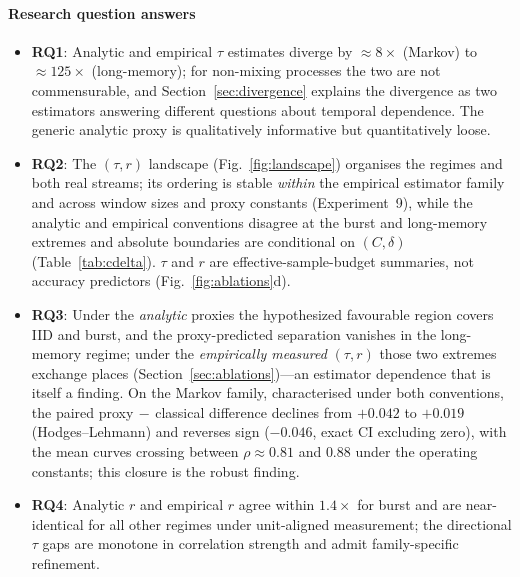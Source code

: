 \documentclass[sensors,article,submit,pdftex,moreauthors]{Definitions/mdpi}
\providecommand{\DIFadd}[1]{{\protect\color{blue}#1}} %
\providecommand{\DIFdel}[1]{} %
\providecommand{\DIFaddbegin}{} %
\providecommand{\DIFaddend}{} %
\providecommand{\DIFdelbegin}{} %
\providecommand{\DIFdelend}{} %
\begin{document}
\paragraph{Research question answers}
\begin{itemize}
    \item \textbf{RQ1}: Analytic \DIFdelbegin \DIFdel{proxies overestimate }\DIFdelend \DIFaddbegin \DIFadd{and }\DIFaddend empirical $\tau$ \DIFaddbegin \DIFadd{estimates diverge }\DIFaddend by $\approx 8\times$ (Markov) to $\approx 125\times$ (long-memory)\DIFdelbegin \DIFdel{, showing the generic robustness bound }\DIFdelend \DIFaddbegin \DIFadd{; for non-mixing processes the two are not commensurable, and Section~\ref{sec:divergence} explains the divergence as two estimators answering different questions about temporal dependence. The generic analytic proxy }\DIFaddend is qualitatively informative but quantitatively loose.
    \item \textbf{RQ2}: The $(\tau, r)$ landscape (Fig.~\ref{fig:landscape}) organises \DIFdelbegin \DIFdel{regimes consistently; family-specific refinements recover additional predictive power, as the Markov sweep illustrates. }\DIFdelend \DIFaddbegin \DIFadd{the regimes and both real streams; its ordering is stable }\emph{\DIFadd{within}} \DIFadd{the empirical estimator family and across window sizes and proxy constants (Experiment~9), while the analytic and empirical conventions disagree at the burst and long-memory extremes and absolute boundaries are conditional on $(C, \delta)$ (Table~\ref{tab:cdelta}). $\tau$ and $r$ are effective-sample-budget summaries, not accuracy predictors (Fig.~\ref{fig:ablations}d).
    }\DIFaddend \item \textbf{RQ3}: \DIFdelbegin \DIFdel{Using empirical $\tau$, the proxy remains above the classical baseline at IID , }\DIFdelend \DIFaddbegin \DIFadd{Under the }\emph{\DIFadd{analytic}} \DIFadd{proxies the hypothesized favourable region covers IID and }\DIFaddend burst, and \DIFdelbegin \DIFdel{low-to-moderate Markov; the proxy-model crossover occurs near $\rho \approx 0.88$; }\DIFdelend the \DIFdelbegin \DIFdel{proxy is absent in the }\DIFdelend \DIFaddbegin \DIFadd{proxy-predicted separation vanishes in the }\DIFaddend long-memory \DIFdelbegin \DIFdel{regime}\DIFdelend \DIFaddbegin \DIFadd{regime; under the }\emph{\DIFadd{empirically measured}} \DIFadd{$(\tau, r)$ those two extremes exchange places (Section~\ref{sec:ablations})---an estimator dependence that is itself a finding. On the Markov family, characterised under both conventions, the paired proxy$\,-\,$classical difference declines from $+0.042$ to $+0.019$ (Hodges--Lehmann) and reverses sign ($-0.046$, exact CI excluding zero), with the mean curves crossing between $\rho \approx 0.81$ and $0.88$ under the operating constants; this closure is the robust finding}\DIFaddend .
    \item \textbf{RQ4}: Analytic $r$ and empirical $r$ agree within $1.4\times$ for burst and are near-identical for all other regimes under unit-aligned measurement; the directional $\tau$ gaps are monotone in correlation strength and admit family-specific refinement.
\end{itemize}
\end{document}
